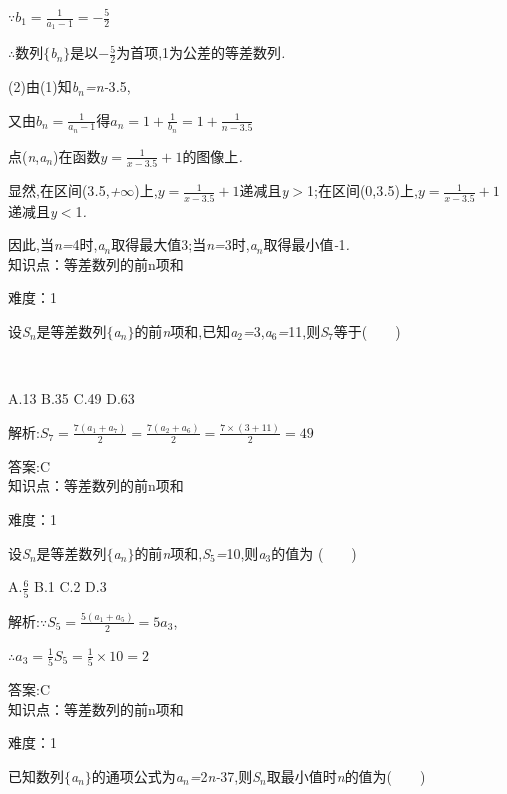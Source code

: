 \documentclass{article} %
\begin{document}
$\because b_1=\frac{1}{a_1-1}=-\frac{5}{2}$

\textit{$\therefore$}数列$\mathrm{\{}$\textit{b${}_{n}$}$\mathrm{\}}$是以$-\frac{5}{2}$为首项,1为公差的等差数列\textit{.}

 (2)由(1)知\textit{b${}_{n}$=n-}3\textit{.}5,

又由$b_n=\frac{1}{a_n-1}$得$a_n=1+\frac{1}{b_n}=1+\frac{1}{n-3.5}$

点(\textit{n},\textit{a${}_{n}$})在函数$y=\frac{1}{x-3.5}+1$的图像上\textit{.}

显然,在区间(3\textit{.}5,\textit{+$\infty$})上,$y=\frac{1}{x-3.5}+1$递减且\textit{y$>$}1;在区间(0,3\textit{.}5)上,$y=\frac{1}{x-3.5}+1$递减且\textit{y$<$}1\textit{.}

因此,当\textit{n=}4时,\textit{a${}_{n}$}取得最大值3;当\textit{n=}3时,\textit{a${}_{n}$}取得最小值\textit{-}1\textit{.} \\
 
知识点：等差数列的前n项和

难度：1

 设\textit{S${}_{n}$}是等差数列$\mathrm{\{}$\textit{a${}_{n}$}$\mathrm{\}}$的前\textit{n}项和,已知\textit{a}${}_{2}$\textit{=}3,\textit{a}${}_{6}$\textit{=}11,则\textit{S}${}_{7}$等于(\textit{　　})

 \textit{　　　　　　　　　　　　　　　　}

 A.13 B.35 C.49 D.63

 解析:$S_7=\frac{7(a_1+a_7)}{2}=\frac{7(a_2+a_6)}{2}=\frac{7\times (3+11)}{2}=49$
 
 答案:C \\

知识点：等差数列的前n项和

难度：1

 设\textit{S${}_{n}$}是等差数列$\mathrm{\{}$\textit{a${}_{n}$}$\mathrm{\}}$的前\textit{n}项和,\textit{S}${}_{5}$\textit{=}10,则\textit{a}${}_{3}$的值为 (\textit{　　})

 A.$\frac{6}{5}$ B.1 C.2 D.3

 解析:$\because S_5=\frac{5(a_1+a_5)}{2}=5a_3$,

$\therefore a_3=\frac{1}{5}S_5=\frac{1}{5}\times 10 = 2$

 答案:C \\

知识点：等差数列的前n项和

难度：1

 已知数列$\mathrm{\{}$\textit{a${}_{n}$}$\mathrm{\}}$的通项公式为\textit{a${}_{n}$=}2\textit{n-}37,则\textit{S${}_{n}$}取最小值时\textit{n}的值为(\textit{　　})
\end{document}
